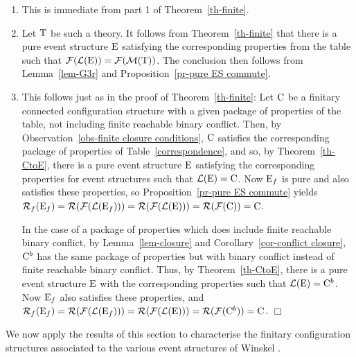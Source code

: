 \documentclass[twocolumn]{article}
\newcommand{\thm}[1]{Theorem~\ref{th-#1}}
\newcommand{\pr}[1]{Proposition~\ref{pr-#1}}
\newcommand{\lem}[1]{Lemma~\ref{lem-#1}}
\newcommand{\cor}[1]{Corollary~\ref{cor-#1}}
\newcommand{\ob}[1]{Observation~\ref{obs-#1}}
\begin{document}
\begin{enumerate}
\item This is immediate from part 1 of Theorem~\ref{th-finite}.
\item  Let ${\rm T}$ be such a theory. It follows from Theorem~\ref{th-finite}
that there is a pure event structure ${\rm E}$ satisfying the corresponding properties 
from the table such that  ${\cal F}({\cal L}({\rm E})) = {\cal F}({\cal M}({\rm T}))$. The
conclusion then follows from \lem{G3r} and \pr{pure ES commute}.
\item This follows just as in the proof of \thm{finite}:
Let ${\rm C}$ be a finitary connected configuration structure with a given package
of properties of the table, not including finite reachable binary conflict.
Then, by \ob{finite closure conditions}, ${\rm C}$ satisfies the
corresponding package of properties of Table~\ref{correspondence},
and so, by \thm{CtoE}, there is a pure  event structure ${\rm E}$ satisfying 
the corresponding properties for event structures such that 
${\cal L}({\rm E}) = {\rm C}$.
Now ${\rm E}_f$ is pure and also satisfies these properties, so \pr{pure ES
commute} yields
${\cal R}_f({\rm E}_f) = {\cal R}({\cal F}({\cal L}({\rm E}_f))) = {\cal R}({\cal F}({\cal L}({\rm E}))) = {\cal R}({\cal F}({\rm C})) = {\rm C}$.

In the case of a package of properties which does include finite reachable
binary conflict, by \lem{closure} and \cor{conflict closure}, ${\rm C}^b$
has the same package of properties but with binary conflict instead of
finite reachable binary conflict. Thus, by \thm{CtoE}, there is a pure event
structure ${\rm E}$ with the corresponding properties such that
${\cal L}({\rm E})={\rm C}^b$.  Now ${\rm E}_f$ also satisfies these properties, and
${\cal R}_f({\rm E}_f) = {\cal R}({\cal F}({\cal L}({\rm E}_f))) = {\cal R}({\cal F}({\cal L}({\rm E}))) =
{\cal R}({\cal F}({\rm C}^b)) = {\rm C}$.
\hfill$\Box$
\end{enumerate}



\noindent
We now apply the results of this section to characterise the finitary
configuration structures associated to the various event structures of
{\sc Winskel} \cite{Wi87a,Wi89}.
\end{document}
